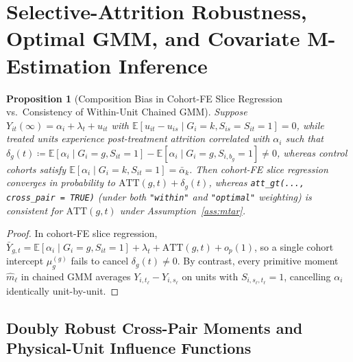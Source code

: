 \documentclass[11pt]{article}
\newtheorem{proposition}{Proposition}
\theoremstyle{definition}
\theoremstyle{remark}
\begin{document}
\section{Selective-Attrition Robustness, Optimal GMM, and Covariate M-Estimation Inference}

\begin{proposition}[Composition Bias in Cohort-FE Slice Regression vs.\ Consistency of Within-Unit Chained GMM]\label{prop:attrition}
Suppose $Y_{it}(\infty) = \alpha_i + \lambda_t + u_{it}$ with $\mathbb{E}[u_{it} - u_{is} \mid G_i = k, S_{is} = S_{it} = 1] = 0$, while treated units experience post-treatment attrition correlated with $\alpha_i$ such that $\delta_g(t) \coloneqq \mathbb{E}[\alpha_i \mid G_i = g, S_{it} = 1] - \mathbb{E}[\alpha_i \mid G_i = g, S_{i,b_g} = 1] \neq 0$, whereas control cohorts satisfy $\mathbb{E}[\alpha_i \mid G_i = k, S_{it} = 1] = \bar{\alpha}_k$. Then cohort-FE slice regression converges in probability to $\mathrm{ATT}(g,t) + \delta_g(t)$, whereas \texttt{att\_gt(..., cross\_pair = TRUE)} (under both \texttt{"within"} and \texttt{"optimal"} weighting) is consistent for $\mathrm{ATT}(g,t)$ under Assumption~\ref{ass:mtar}.
\end{proposition}

\begin{proof}
In cohort-FE slice regression, $\bar{Y}_{g,t} = \mathbb{E}[\alpha_i \mid G_i=g, S_{it}=1] + \lambda_t + \mathrm{ATT}(g,t) + o_p(1)$, so a single cohort intercept $\mu_g^{(g)}$ fails to cancel $\delta_g(t) \neq 0$. By contrast, every primitive moment $\hat{m}_\ell$ in chained GMM averages $Y_{i,t_\ell} - Y_{i,s_\ell}$ on units with $S_{i,s_\ell,t_\ell}=1$, cancelling $\alpha_i$ identically unit-by-unit.
\end{proof}

\subsection{Doubly Robust Cross-Pair Moments and Physical-Unit Influence Functions}
\end{document}
